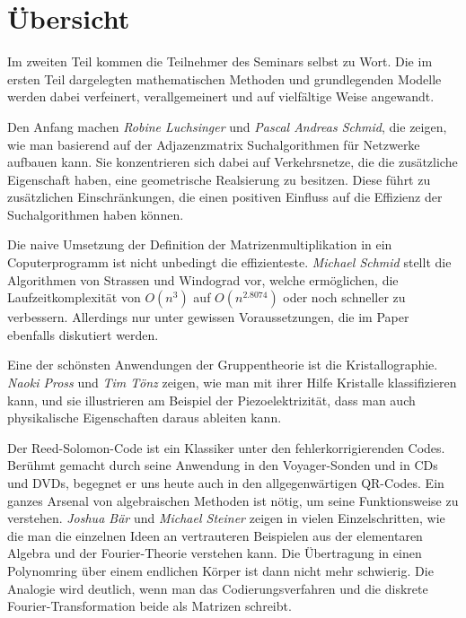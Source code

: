 %
%
%
\chapter*{Übersicht}
\rhead{}
\label{buch:uebersicht}
Im zweiten Teil kommen die Teilnehmer des Seminars selbst zu Wort.
Die im ersten Teil dargelegten mathematischen Methoden und
grundlegenden Modelle werden dabei verfeinert, verallgemeinert
und auf vielfältige Weise angewandt.

Den Anfang machen {\em Robine Luchsinger} und {\em Pascal Andreas Schmid},
%
%
die zeigen, wie man basierend auf der Adjazenzmatrix Suchalgorithmen
für Netzwerke aufbauen kann.
Sie konzentrieren sich dabei auf Verkehrsnetze, die die zusätzliche
Eigenschaft haben, eine geometrische Realsierung zu besitzen.
Diese führt zu zusätzlichen Einschränkungen, die einen positiven
Einfluss auf die Effizienz der Suchalgorithmen haben können.

Die naive Umsetzung der Definition der Matrizenmultiplikation in
ein Coputerprogramm ist nicht unbedingt die effizienteste.
{\em Michael Schmid} stellt die Algorithmen von Strassen und
%
Windograd vor, welche ermöglichen, die Laufzeitkomplexität
von $O(n^3)$ auf $O(n^{2.8074})$ oder noch schneller zu verbessern.
Allerdings nur unter gewissen Voraussetzungen, die im Paper
ebenfalls diskutiert werden.

Eine der schönsten Anwendungen der Gruppentheorie ist die
Kristallographie.
{\em Naoki Pross} und {\em Tim Tönz} zeigen, wie man mit ihrer
%
%
Hilfe Kristalle klassifizieren kann, und sie illustrieren am Beispiel
der Piezoelektrizität, dass man auch physikalische Eigenschaften daraus
ableiten kann.

Der Reed-Solomon-Code ist ein Klassiker unter den fehlerkorrigierenden
Codes.
Berühmt gemacht durch seine Anwendung in den Voyager-Sonden und in CDs
und DVDs, begegnet er uns heute auch in den allgegenwärtigen QR-Codes.
Ein ganzes Arsenal von algebraischen Methoden ist nötig, um seine
Funktionsweise zu verstehen.
{\em Joshua Bär} und {\em Michael Steiner} zeigen in vielen Einzelschritten,
%
%
wie die man die einzelnen Ideen an vertrauteren Beispielen aus der
elementaren Algebra und der Fourier-Theorie verstehen kann.
Die Übertragung in einen Polynomring über einem endlichen Körper 
ist dann nicht mehr schwierig.
Die Analogie wird deutlich, wenn man das Codierungsverfahren und
die diskrete Fourier-Transformation beide als Matrizen schreibt.


